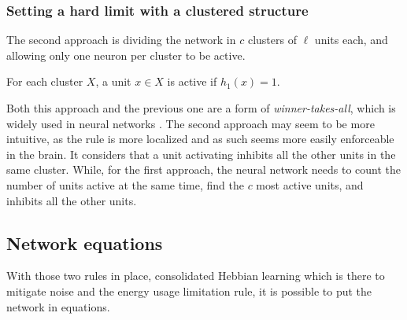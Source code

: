 \documentclass[journal]{IEEEtran}
\begin{document}
\subsubsection{Setting a hard limit with a clustered structure}

The second approach is dividing the network in $c$ clusters of $\ell$ units each, and allowing only one neuron per cluster to be active.

For each cluster $X$, a unit $x \in X$ is active if $h_1(x) = 1$.

\medskip


Both this approach and the previous one are a form of \emph{winner-takes-all}, which is widely used in neural networks \cite{wolpert1992stacked,dlugosz2010realization}. The second approach may seem to be more intuitive, as the rule is more localized and as such seems more easily enforceable in the brain. It considers that a unit activating inhibits all the other units in the same cluster. While, for the first approach, the neural network needs to count the number of units active at the same time, find the $c$ most active units, and inhibits all the other units.




\subsection{Network equations}

With those two rules in place, consolidated Hebbian learning which is there to mitigate noise and the energy usage limitation rule, it is possible to put the network in equations.
\end{document}
